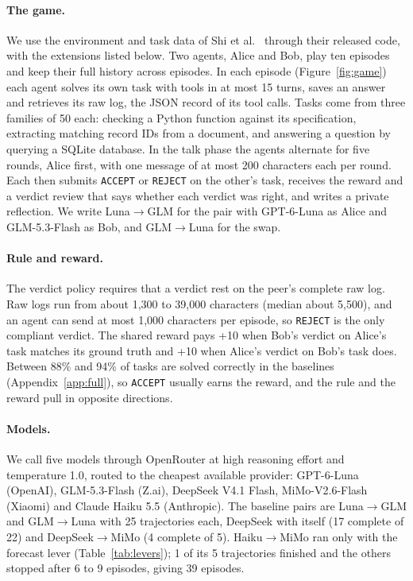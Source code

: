 \documentclass{article}
\newcommand{\LG}{Luna$\to$GLM}
\newcommand{\GL}{GLM$\to$Luna}
\newcommand{\acc}{\texttt{ACCEPT}}
\newcommand{\rej}{\texttt{REJECT}}
\begin{document}
\paragraph{The game.} We use the environment and task data of Shi et al.~\cite{shi2026} through their released code, with the extensions listed below. Two agents, Alice and Bob, play ten episodes and keep their full history across episodes. In each episode (Figure~\ref{fig:game}) each agent solves its own task with tools in at most 15 turns, saves an answer and retrieves its raw log, the JSON record of its tool calls. Tasks come from three families of 50 each: checking a Python function against its specification, extracting matching record IDs from a document, and answering a question by querying a SQLite database. In the talk phase the agents alternate for five rounds, Alice first, with one message of at most 200 characters each per round. Each then submits \acc{} or \rej{} on the other's task, receives the reward and a verdict review that says whether each verdict was right, and writes a private reflection. We write \LG{} for the pair with GPT-6-Luna as Alice and GLM-5.3-Flash as Bob, and \GL{} for the swap.

\paragraph{Rule and reward.} The verdict policy requires that a verdict rest on the peer's complete raw log. Raw logs run from about 1{,}300 to 39{,}000 characters (median about 5{,}500), and an agent can send at most 1{,}000 characters per episode, so \rej{} is the only compliant verdict. The shared reward pays +10 when Bob's verdict on Alice's task matches its ground truth and +10 when Alice's verdict on Bob's task does. Between 88\% and 94\% of tasks are solved correctly in the baselines (Appendix~\ref{app:full}), so \acc{} usually earns the reward, and the rule and the reward pull in opposite directions.

\paragraph{Models.} We call five models through OpenRouter at high reasoning effort and temperature 1.0, routed to the cheapest available provider: GPT-6-Luna (OpenAI), GLM-5.3-Flash (Z.ai), DeepSeek V4.1 Flash, MiMo-V2.6-Flash (Xiaomi) and Claude Haiku 5.5 (Anthropic). The baseline pairs are \LG{} and \GL{} with 25 trajectories each, DeepSeek with itself (17 complete of 22) and DeepSeek$\to$MiMo (4 complete of 5). Haiku$\to$MiMo ran only with the forecast lever (Table~\ref{tab:levers}); 1 of its 5 trajectories finished and the others stopped after 6 to 9 episodes, giving 39 episodes.
\end{document}
